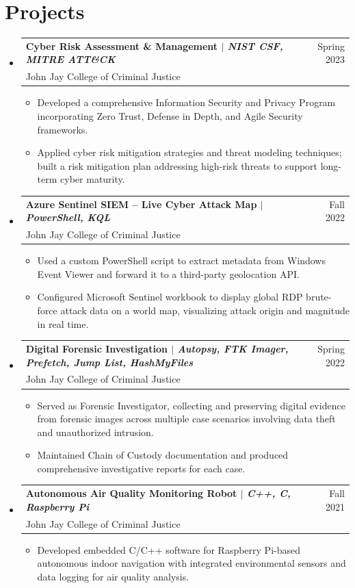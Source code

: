 \documentclass[A4]{article}
\makeatletter
\newcommand{\CVItem}[1]{
  \item\small{
    {#1 \vspace{-2pt}}
  }
}
\newcommand{\CVSubheading}[4]{
  \vspace{-4pt}\item
    \begin{tabular*}{0.97\textwidth}[t]{l@{\extracolsep{\fill}}r}
      \textbf{#1} & #2 \\
      \small#3 & \small #4 \\
    \end{tabular*}\vspace{-7pt}
}
\newcommand{\CVSubHeadingListStart}{\begin{itemize}[leftmargin=0.5cm, label={}]}
\newcommand{\CVSubHeadingListEnd}{\end{itemize}}
\newcommand{\CVItemListStart}{\begin{itemize}}
\newcommand{\CVItemListEnd}{\end{itemize}\vspace{-5pt}}
\makeatother
\begin{document}
\section{Projects}
  \CVSubHeadingListStart

    \CVSubheading
      {{Cyber Risk Assessment \& Management} $|$ \emph{\small{NIST CSF, MITRE ATT\&CK}}}{Spring 2023}
      {John Jay College of Criminal Justice}{}
      \CVItemListStart
        \CVItem{Developed a comprehensive Information Security and Privacy Program incorporating Zero Trust, Defense in Depth, and Agile Security frameworks.}
        \CVItem{Applied cyber risk mitigation strategies and threat modeling techniques; built a risk mitigation plan addressing high-risk threats to support long-term cyber maturity.}
      \CVItemListEnd

    \CVSubheading
      {{Azure Sentinel SIEM -- Live Cyber Attack Map} $|$ \emph{\small{PowerShell, KQL}}}{Fall 2022}
      {John Jay College of Criminal Justice}{}
      \CVItemListStart
        \CVItem{Used a custom PowerShell script to extract metadata from Windows Event Viewer and forward it to a third-party geolocation API.}
        \CVItem{Configured Microsoft Sentinel workbook to display global RDP brute-force attack data on a world map, visualizing attack origin and magnitude in real time.}
      \CVItemListEnd

    \CVSubheading
      {{Digital Forensic Investigation} $|$ \emph{\small{Autopsy, FTK Imager, Prefetch, Jump List, HashMyFiles}}}{Spring 2022}
      {John Jay College of Criminal Justice}{}
      \CVItemListStart
        \CVItem{Served as Forensic Investigator, collecting and preserving digital evidence from forensic images across multiple case scenarios involving data theft and unauthorized intrusion.}
        \CVItem{Maintained Chain of Custody documentation and produced comprehensive investigative reports for each case.}
      \CVItemListEnd

    \CVSubheading
      {{Autonomous Air Quality Monitoring Robot} $|$ \emph{\small{C++, C, Raspberry Pi}}}{Fall 2021}
      {John Jay College of Criminal Justice}{}
      \CVItemListStart
        \CVItem{Developed embedded C/C++ software for Raspberry Pi-based autonomous indoor navigation with integrated environmental sensors and data logging for air quality analysis.}
      \CVItemListEnd

  \CVSubHeadingListEnd
\end{document}
